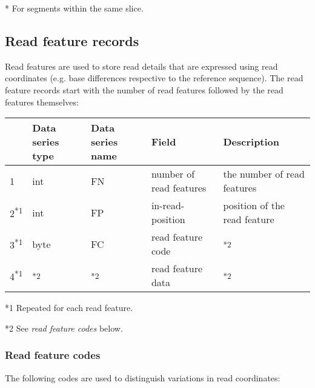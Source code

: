 \documentclass[a4paper]{article}
\begin{document}
* For segments within the same slice.

\subsection{\textbf{Read feature records}}

Read features are used to store read details that are expressed using read coordinates 
(e.g. base differences respective to the reference sequence). The read feature 
records start with the number of read features followed by the read features themselves:

\begin{tabular}{|>{\raggedright}p{36pt}|>{\raggedright}p{65pt}|>{\raggedright}p{84pt}|>{\raggedright}p{90pt}|>{\raggedright}p{168pt}|}
\hline
 & \textbf{Data series type} & \textbf{Data series name} & \textbf{Field} & \textbf{Description}\tabularnewline
\hline
1 & int & FN & number of read features & the number of read features\tabularnewline 
\hline
2\textsuperscript{*1}  & int & FP & in-read-position & position of the read feature\tabularnewline 
\hline
3\textsuperscript{*1} & byte & FC & read feature code & \textsuperscript{*2}\tabularnewline
\hline
4\textsuperscript{*1} & \textsuperscript{*2} & \textsuperscript{*2} & read feature data & \textsuperscript{*2}\tabularnewline
\hline
\end{tabular}

*1 Repeated for each read feature.

*2 See \emph{read feature codes} below.

\subsubsection*{Read feature codes}

The following codes are used to distinguish variations in read coordinates:
\end{document}
